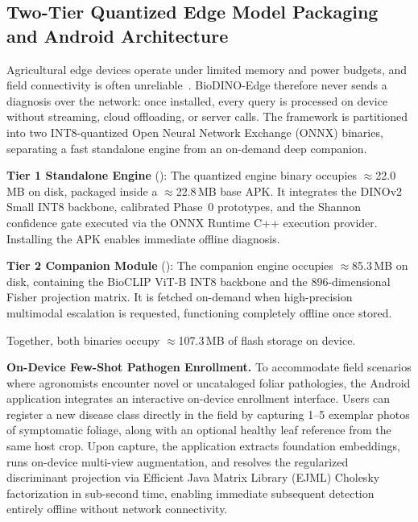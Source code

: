 \subsection{Two-Tier Quantized Edge Model Packaging and Android Architecture}
\label{sec:packaging}
Agricultural edge devices operate under limited memory and power budgets, and field connectivity is often unreliable~\cite{sharif2026real,radocaj2025evolution}. BioDINO-Edge therefore never sends a diagnosis over the network: once installed, every query is processed on device without streaming, cloud offloading, or server calls. The framework is partitioned into two INT8-quantized Open Neural Network Exchange (ONNX) binaries, separating a fast standalone engine from an on-demand deep companion.

\textbf{Tier 1 Standalone Engine} (): The quantized engine binary occupies $\approx$22.0\,MB on disk, packaged inside a $\approx$22.8\,MB base APK. It integrates the DINOv2 Small INT8 backbone, calibrated Phase~0 prototypes, and the Shannon confidence gate executed via the ONNX Runtime C++ execution provider. Installing the APK enables immediate offline diagnosis.

\textbf{Tier 2 Companion Module} (): The companion engine occupies $\approx$85.3\,MB on disk, containing the BioCLIP ViT-B INT8 backbone and the 896-dimensional Fisher projection matrix. It is fetched on-demand when high-precision multimodal escalation is requested, functioning completely offline once stored.

Together, both binaries occupy $\approx$107.3\,MB of flash storage on device.

\textbf{On-Device Few-Shot Pathogen Enrollment.} To accommodate field scenarios where agronomists encounter novel or uncataloged foliar pathologies, the Android application integrates an interactive on-device enrollment interface. Users can register a new disease class directly in the field by capturing 1--5 exemplar photos of symptomatic foliage, along with an optional healthy leaf reference from the same host crop. Upon capture, the application extracts foundation embeddings, runs on-device multi-view augmentation, and resolves the regularized discriminant projection via Efficient Java Matrix Library (EJML) Cholesky factorization in sub-second time, enabling immediate subsequent detection entirely offline without network connectivity.

